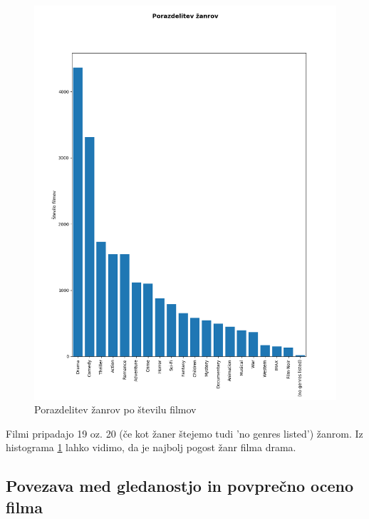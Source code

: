 \documentclass[a4paper,11pt]{article}
\begin{document}
\begin{figure}[htbp]
\begin{center}
\includegraphics[scale=0.4]{genresDist.png}
\caption{Porazdelitev žanrov po številu filmov} \label{fig:img1}
\end{center}
\end{figure}
Filmi pripadajo 19 oz. 20 (če kot žaner štejemo tudi 'no genres listed') žanrom.
Iz histograma \ref{fig:img1} lahko vidimo, da je najbolj pogost žanr filma drama.


\subsection{Povezava med gledanostjo in povprečno oceno filma}
\end{document}
